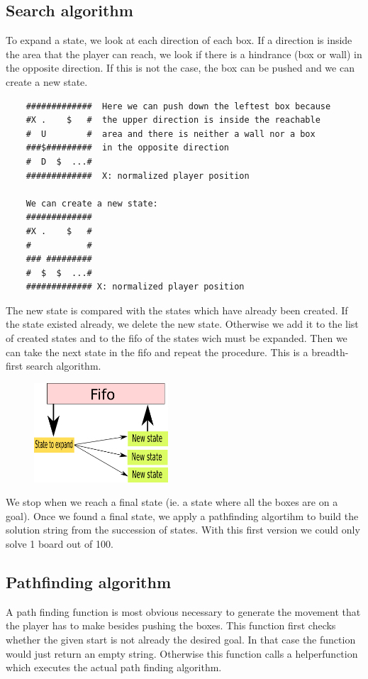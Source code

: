 \documentclass[a4paper,10pt]{article}
\begin{document}
	\subsection{Search algorithm}
	To expand a state, we look at each direction of each box. 
	If a direction is inside the area that the player can reach, we look if there is a hindrance (box or wall) in the opposite direction.
	If this is not the case, the box can be pushed and we can create a new state.

	\begin{verbatim}
	#############  Here we can push down the leftest box because 
	#X .    $   #  the upper direction is inside the reachable 
	#  U        #  area and there is neither a wall nor a box
	###$#########  in the opposite direction
	#  D  $  ...#  
	#############  X: normalized player position

	We can create a new state:
	#############
	#X .    $   #
	#           #
	### #########
	#  $  $  ...#
	############# X: normalized player position
	\end{verbatim}

	The new state is compared with the states which have already been created. 
	If the state existed already, we delete the new state.
	Otherwise we add it to the list of created states and to the fifo of the states wich must be expanded.
	Then we can take the next state in the fifo and repeat the procedure.
	This is a breadth-first search algorithm.

	\begin{figure}[h]
	\centerline{\includegraphics[height=5 cm, width=5cm]{./state_fifo.png}}
	\end{figure}

	We stop when we reach a final state (ie. a state where all the boxes are on a goal).
	Once we found a final state, we apply a pathfinding algortihm to build the solution string from the succession of states.
 With this first version we could only solve 1 board out of 100. 

	\subsection{Pathfinding algorithm}
A path finding function is most obvious necessary to generate the movement that the player has to make besides pushing the boxes.
This function first checks whether the given start is not already the desired goal. In that case the function would just return an empty string. 
Otherwise this function calls a helperfunction which executes the actual path finding algorithm.
\end{document}
